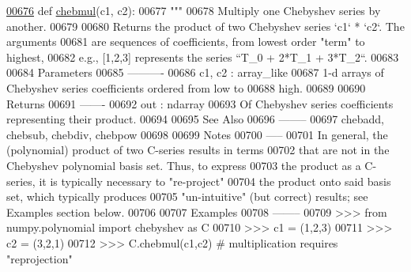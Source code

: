 \begin{DoxyCode}
\hypertarget{namespacepyneb_1_1utils_1_1chebyshev_l00676}{}\hyperlink{namespacepyneb_1_1utils_1_1chebyshev_aca5aab8be2c47559d4489fd1dac11f75}{00676} \textcolor{keyword}{def }\hyperlink{namespacepyneb_1_1utils_1_1chebyshev_aca5aab8be2c47559d4489fd1dac11f75}{chebmul}(c1, c2):
00677     \textcolor{stringliteral}{"""}
00678 \textcolor{stringliteral}{    Multiply one Chebyshev series by another.}
00679 \textcolor{stringliteral}{}
00680 \textcolor{stringliteral}{    Returns the product of two Chebyshev series `c1` * `c2`.  The arguments}
00681 \textcolor{stringliteral}{    are sequences of coefficients, from lowest order "term" to highest,}
00682 \textcolor{stringliteral}{    e.g., [1,2,3] represents the series ``T\_0 + 2*T\_1 + 3*T\_2``.}
00683 \textcolor{stringliteral}{}
00684 \textcolor{stringliteral}{    Parameters}
00685 \textcolor{stringliteral}{    ----------}
00686 \textcolor{stringliteral}{    c1, c2 : array\_like}
00687 \textcolor{stringliteral}{        1-d arrays of Chebyshev series coefficients ordered from low to}
00688 \textcolor{stringliteral}{        high.}
00689 \textcolor{stringliteral}{}
00690 \textcolor{stringliteral}{    Returns}
00691 \textcolor{stringliteral}{    -------}
00692 \textcolor{stringliteral}{    out : ndarray}
00693 \textcolor{stringliteral}{        Of Chebyshev series coefficients representing their product.}
00694 \textcolor{stringliteral}{}
00695 \textcolor{stringliteral}{    See Also}
00696 \textcolor{stringliteral}{    --------}
00697 \textcolor{stringliteral}{    chebadd, chebsub, chebdiv, chebpow}
00698 \textcolor{stringliteral}{}
00699 \textcolor{stringliteral}{    Notes}
00700 \textcolor{stringliteral}{    -----}
00701 \textcolor{stringliteral}{    In general, the (polynomial) product of two C-series results in terms}
00702 \textcolor{stringliteral}{    that are not in the Chebyshev polynomial basis set.  Thus, to express}
00703 \textcolor{stringliteral}{    the product as a C-series, it is typically necessary to "re-project"}
00704 \textcolor{stringliteral}{    the product onto said basis set, which typically produces}
00705 \textcolor{stringliteral}{    "un-intuitive" (but correct) results; see Examples section below.}
00706 \textcolor{stringliteral}{}
00707 \textcolor{stringliteral}{    Examples}
00708 \textcolor{stringliteral}{    --------}
00709 \textcolor{stringliteral}{    >>> from numpy.polynomial import chebyshev as C}
00710 \textcolor{stringliteral}{    >>> c1 = (1,2,3)}
00711 \textcolor{stringliteral}{    >>> c2 = (3,2,1)}
00712 \textcolor{stringliteral}{    >>> C.chebmul(c1,c2) # multiplication requires "reprojection"}

\end{DoxyCode}
